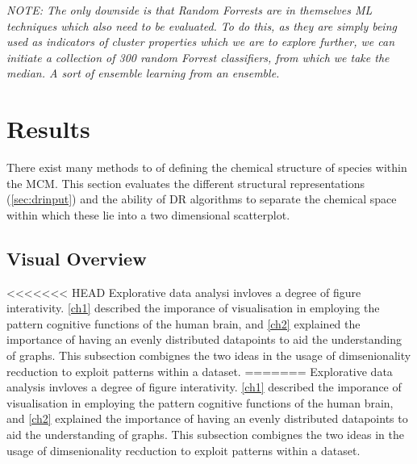 %

\textit{NOTE: The only downside is that Random Forrests are in themselves ML techniques which also need to be evaluated. To do this, as they are simply being used as indicators of cluster properties which we are to explore further, we can initiate a collection of 300 random Forrest classifiers, from which we take the median. A sort of ensemble learning from an ensemble. }


\section{Results}\label{sec:drres}
%
There exist many methods to of defining the chemical structure of species within the MCM. This section evaluates the different structural representations (\autoref{sec:drinput}) and the ability of DR algorithms to separate the chemical space within which these lie into a two dimensional scatterplot.

%

\subsection{Visual Overview}\label{sec:cldist}
<<<<<<< HEAD
Explorative data analysi invloves a degree of figure interativity. \autoref{ch1} described the imporance of visualisation in employing the pattern cognitive functions of the human brain, and \autoref{ch2} explained the importance of having an evenly distributed datapoints to aid the understanding of graphs. This subsection combignes the two ideas in the usage of dimsenionality recduction to exploit patterns within a dataset.
=======
Explorative data analysis invloves a degree of figure interativity. \autoref{ch1} described the imporance of visualisation in employing the pattern cognitive functions of the human brain, and \autoref{ch2} explained the importance of having an evenly distributed datapoints to aid the understanding of graphs. This subsection combignes the two ideas in the usage of dimsenionality recduction to exploit patterns within a dataset.


